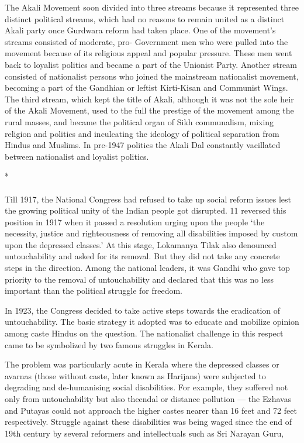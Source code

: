 \begin{multicols}{2}
The Akali Movement soon divided into three streams because it represented three distinct political streams, which had no reasons to remain united as a distinct Akali party once Gurdwara reform had taken place. One of the movement's streams consisted of moderate, pro- Government men who were pulled into the movement because of its religious appeal and popular pressure. These men went back to loyalist politics and became a part of the Unionist Party. Another stream consisted of nationalist persons who joined the mainstream nationalist movement, becoming a part of the Gandhian or leftist Kirti-Kisan and Communist Wings. The third stream, which kept the title of Akali, although it was not the sole heir of the Akali Movement, used to the full the prestige of the movement among the rural masses, and became the political organ of Sikh communalism, mixing religion and politics and inculcating the ideology of political separation from Hindus and Muslims. In pre-1947 politics the Akali Dal constantly vacillated between nationalist and loyalist politics.

\begin{center}*\end{center}

\paragraph*{}

Till 1917, the National Congress had refused to take up social reform issues lest the growing political unity of the Indian people got disrupted. 11 reversed this position in 1917 when it passed a resolution urging upon the people `the necessity, justice and righteousness of removing all disabilities imposed by custom upon the depressed classes.' At this stage, Lokamanya Tilak also denounced untouchability and asked for its removal. But they did not take any concrete steps in the direction. Among the national leaders, it was Gandhi who gave top priority to the removal of untouchability and declared that this was no less important than the political struggle for freedom.

In 1923, the Congress decided to take active steps towards the eradication of untouchability. The basic strategy it adopted was to educate and mobilize opinion among caste Hindus on the question. The nationalist challenge in this respect came to be symbolized by two famous struggles in Kerala.

The problem was particularly acute in Kerala where the depressed classes or avarnas (those without caste, later known as Harijans) were subjected to degrading and de-humanising social disabilities. For example, they suffered not only from untouchability but also theendal or distance pollution --- the Ezhavas and Putayas could not approach the higher castes nearer than 16 feet and 72 feet respectively. Struggle against these disabilities was being waged since the end of 19th century by several reformers and intellectuals such as Sri Narayan Guru,


\end{multicols}
